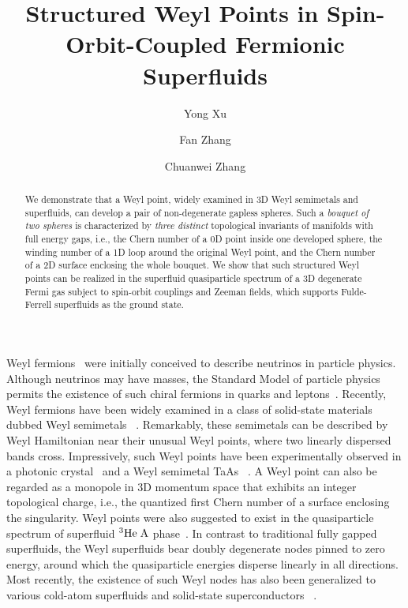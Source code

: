 \documentclass[prl,aps,twocolumn,showpacs,floatfix]{revtex4}
\begin{document}
\title{Structured Weyl Points in Spin-Orbit-Coupled Fermionic Superfluids}
\author{Yong Xu}
\author{Fan Zhang}
\author{Chuanwei Zhang}

\begin{abstract}
We demonstrate that a Weyl point, widely examined in 3D Weyl semimetals and
superfluids, can develop a pair of non-degenerate gapless spheres. Such a
\emph{bouquet of two spheres} is characterized by \emph{three distinct}
topological invariants of manifolds with full energy gaps, i.e., the Chern
number of a 0D point inside one developed sphere, the winding number of a 1D
loop around the original Weyl point, and the Chern number of a 2D surface
enclosing the whole bouquet. We show that such structured Weyl points can be
realized in the superfluid quasiparticle spectrum of a 3D degenerate Fermi
gas subject to spin-orbit couplings and Zeeman fields, which supports
Fulde-Ferrell superfluids as the ground state.
\end{abstract}

\maketitle

Weyl fermions~\cite{Weyl} were initially conceived to describe neutrinos in
particle physics. Although neutrinos may have masses, the Standard Model of
particle physics permits the existence of such chiral fermions in quarks and
leptons~\cite{volovik}. Recently, Weyl fermions have been widely examined in
a class of solid-state materials dubbed Weyl semimetals~\cite%
{Murakami2007NJP,Wan2011prb,Yuanming2011PRB,Burkov2011PRL,ZhongFang2011prl,Aji2012prb,Burkov2012prb,Bernevig2012prl, LingLu2013NP,Xiaoliang2013,Vafek2014,Dai2014,Hasan2015}%
. Remarkably, these semimetals can be described by Weyl Hamiltonian near
their unusual Weyl points, where two linearly dispersed bands cross.
Impressively, such Weyl points have been experimentally observed in a
photonic crystal~\cite{Lu2015} and a Weyl semimetal TaAs~\cite{Xu2015,Lv2015}%
. A Weyl point can also be regarded as a monopole in 3D momentum space that
exhibits an integer topological charge, i.e., the quantized first Chern
number of a surface enclosing the singularity. Weyl points were also
suggested to exist in the quasiparticle spectrum of superfluid $^{3}\mathrm{%
He\;A}$ phase~\cite{volovik}. In contrast to traditional fully gapped
superfluids, the Weyl superfluids bear doubly degenerate nodes pinned to
zero energy, around which the quasiparticle energies disperse linearly in
all directions. Most recently, the existence of such Weyl nodes has also
been generalized to various cold-atom superfluids and solid-state
superconductors~\cite{Gong2011prl,Balents2012PRB,Tumanta2012PRB,
Das2013PRB,Sumanta2013PRA,Yong2014PRL,Yang2014PRL,Balicas2013arXiv,Dong2014arXiv,LiuBo2014arXiv}%
.
\end{document}
